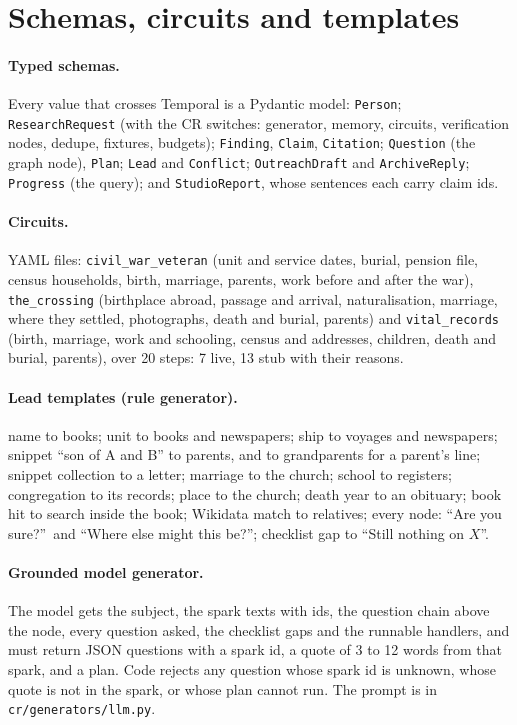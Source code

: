 \section{Schemas, circuits and templates}
\paragraph{Typed schemas.} Every value that crosses Temporal is a Pydantic model: \texttt{Person}; \texttt{ResearchRequest} (with the CR switches: generator, memory, circuits, verification nodes, dedupe, fixtures, budgets); \texttt{Finding}, \texttt{Claim}, \texttt{Citation}; \texttt{Question} (the graph node), \texttt{Plan}; \texttt{Lead} and \texttt{Conflict}; \texttt{OutreachDraft} and \texttt{ArchiveReply}; \texttt{Progress} (the query); and \texttt{StudioReport}, whose sentences each carry claim ids.

\paragraph{Circuits.} YAML files: \texttt{civil\_war\_veteran} (unit and service dates, burial, pension file, census households, birth, marriage, parents, work before and after the war), \texttt{the\_crossing} (birthplace abroad, passage and arrival, naturalisation, marriage, where they settled, photographs, death and burial, parents) and \texttt{vital\_records} (birth, marriage, work and schooling, census and addresses, children, death and burial, parents), over 20 steps: 7 live, 13 stub with their reasons.

\paragraph{Lead templates (rule generator).} name to books; unit to books and newspapers; ship to voyages and newspapers; snippet ``son of A and B'' to parents, and to grandparents for a parent's line; snippet collection to a letter; marriage to the church; school to registers; congregation to its records; place to the church; death year to an obituary; book hit to search inside the book; Wikidata match to relatives; every node: ``Are you sure?''\ and ``Where else might this be?''; checklist gap to ``Still nothing on $X$''.

\paragraph{Grounded model generator.} The model gets the subject, the spark texts with ids, the question chain above the node, every question asked, the checklist gaps and the runnable handlers, and must return JSON questions with a spark id, a quote of 3 to 12 words from that spark, and a plan. Code rejects any question whose spark id is unknown, whose quote is not in the spark, or whose plan cannot run. The prompt is in \texttt{cr/generators/llm.py}.

